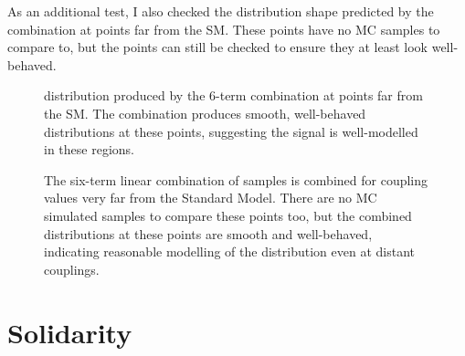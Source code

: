     As an additional test, I also checked the distribution shape predicted by the combination at points far from the SM.
    These points have no MC samples to compare to, but the points can still be checked to ensure they at least look well-behaved.

    \begin{figure}[tbh]
        \centering
        \caption{
            \mhh distribution produced by the 6-term combination at points far from the SM.
            The combination produces smooth, well-behaved distributions at these points,
                suggesting the signal is well-modelled in these regions.
        }
        \label{fig:vbf_hh_6term_preview}
    \end{figure}

    \begin{figure}[tbh]
    	\centering
        \caption{
            The six-term linear combination of samples is combined for coupling values very far from the Standard Model.
            There are no MC simulated samples to compare these points too, but the combined distributions at these points are smooth and well-behaved,
                indicating reasonable modelling of the distribution even at distant couplings.
        }
        \label{fig:vbf_hh_preview}
    \end{figure}


\section{Solidarity} \label{sec:solidarity}
    
